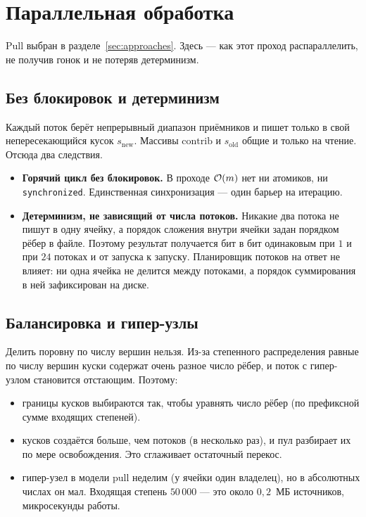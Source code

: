 \section{Параллельная обработка}
\label{sec:parallelism}

Pull выбран в разделе~\ref{sec:approaches}. Здесь --- как этот проход распараллелить, не получив гонок
и не потеряв детерминизм.

\subsection{Без блокировок и детерминизм}
Каждый поток берёт непрерывный диапазон приёмников и пишет только в свой непересекающийся кусок
$s_{\mathrm{new}}$. Массивы $\mathrm{contrib}$ и $s_{\mathrm{old}}$ общие и только на чтение. Отсюда
два следствия.
\begin{itemize}[itemsep=3pt]
  \item \textbf{Горячий цикл без блокировок.} В проходе $\mathcal{O}(m)$ нет ни атомиков, ни
        \texttt{synchronized}. Единственная синхронизация --- один барьер на итерацию.
  \item \textbf{Детерминизм, не зависящий от числа потоков.} Никакие два потока не пишут в одну
        ячейку, а порядок сложения внутри ячейки задан порядком рёбер в файле. Поэтому результат
        получается бит в бит одинаковым при $1$ и при $24$ потоках и от запуска к запуску. Планировщик
        потоков на ответ не влияет: ни одна ячейка не делится между потоками, а порядок суммирования в
        ней зафиксирован на диске.
\end{itemize}

\subsection{Балансировка и гипер-узлы}
Делить поровну по числу вершин нельзя. Из-за степенного распределения равные по числу вершин куски
содержат очень разное число рёбер, и поток с гипер-узлом становится отстающим. Поэтому:
\begin{itemize}[nosep]
  \item границы кусков выбираются так, чтобы уравнять число рёбер (по префиксной сумме входящих
        степеней).
  \item кусков создаётся больше, чем потоков (в несколько раз), и пул разбирает их по мере
        освобождения. Это сглаживает остаточный перекос.
  \item гипер-узел в модели pull неделим (у ячейки один владелец), но в абсолютных числах он мал.
        Входящая степень $50\,000$ --- это около $0{,}2$~МБ источников, микросекунды работы.
\end{itemize}

